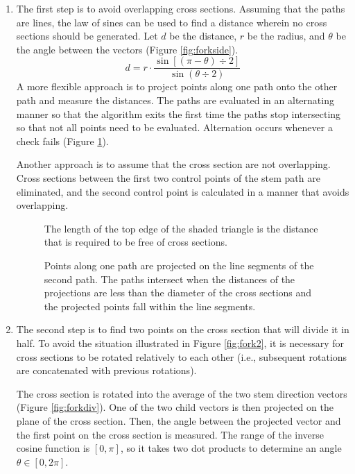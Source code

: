 \documentclass[10pt]{article}
\begin{document}
\begin{enumerate}
\item The first step is to avoid overlapping cross sections. Assuming that the paths are lines, the law of sines can be used to find a distance wherein no cross sections should be generated. Let $ d $ be the distance, $ r $ be the radius, and $ \theta $ be the angle between the vectors (Figure \ref{fig:forkside}).
\[ d = r \cdot \frac{\sin[(\pi-\theta)\div2]}{\sin (\theta\div2)} \]
A more flexible approach is to project points along one path onto the other path and measure the distances. The paths are evaluated in an alternating manner so that the algorithm exits the first time the paths stop intersecting so that not all points need to be evaluated. Alternation occurs whenever a check fails (Figure \ref{fig:path}).

Another approach is to assume that the cross section are not overlapping. Cross sections between the first two control points of the stem path are eliminated, and the second control point is calculated in a manner that avoids overlapping.

\begin{figure}[H]
 \begin{minipage}[H]{0.46\textwidth}
  \centering
  
  \caption{The length of the top edge of the shaded triangle is the distance that is required to be free of cross sections.} \label{fig:forkside}
 \end{minipage}
 \hfill
 \begin{minipage}[H]{0.46\textwidth}
  \centering
  
  \caption{Points along one path are projected on the line segments of the second path. The paths intersect when the distances of the projections are less than the diameter of the cross sections and the projected points fall within the line segments.} \label{fig:path}
 \end{minipage}
\end{figure}

\item The second step is to find two points on the cross section that will divide it in half. To avoid the situation illustrated in Figure \ref{fig:fork2}, it is necessary for cross sections to be rotated relatively to each other (i.e., subsequent rotations are concatenated with previous rotations).

The cross section is rotated into the average of the two stem direction vectors (Figure \ref{fig:forkdiv}). One of the two child vectors is then projected on the plane of the cross section. Then, the angle between the projected vector and the first point on the cross section is measured. The range of the inverse cosine function is $ [0, \pi] $, so it takes two dot products to determine an angle $ \theta \in [0, 2\pi] $.


\end{enumerate}
\end{document}
